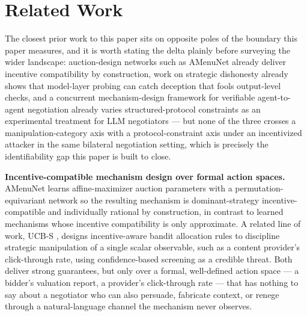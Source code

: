 \documentclass[11pt]{article}
\begin{document}
\section{Related Work}

The closest prior work to this paper sits on opposite poles of the boundary this paper measures, and it is worth stating the delta plainly before surveying the wider landscape: auction-design networks such as AMenuNet \citep{AMenuNet_cNb5hkTfGC} already deliver incentive compatibility by construction, work on strategic dishonesty \citep{StrategicDishonesty_IbDr8xgUMW} already shows that model-layer probing can catch deception that fools output-level checks, and a concurrent mechanism-design framework for verifiable agent-to-agent negotiation \citep{arXiv260814613} already varies structured-protocol constraints as an experimental treatment for LLM negotiators --- but none of the three crosses a manipulation-category axis with a protocol-constraint axis under an incentivized attacker in the same bilateral negotiation setting, which is precisely the identifiability gap this paper is built to close.

\textbf{Incentive-compatible mechanism design over formal action spaces.} AMenuNet \citep{AMenuNet_cNb5hkTfGC} learns affine-maximizer auction parameters with a permutation-equivariant network so the resulting mechanism is dominant-strategy incentive-compatible and individually rational by construction, in contrast to learned mechanisms whose incentive compatibility is only approximate. A related line of work, UCB-S \citep{UCBS_lsxeNvYqCj}, designs incentive-aware bandit allocation rules to discipline strategic manipulation of a single scalar observable, such as a content provider's click-through rate, using confidence-based screening as a credible threat. Both deliver strong guarantees, but only over a formal, well-defined action space --- a bidder's valuation report, a provider's click-through rate --- that has nothing to say about a negotiator who can also persuade, fabricate context, or renege through a natural-language channel the mechanism never observes.
\end{document}
